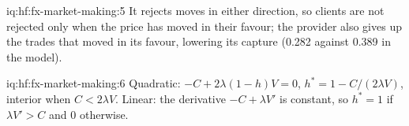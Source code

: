 \begin{solution}{iq:hf:fx-market-making:5}
It rejects moves in either direction, so clients are not rejected only when the price has moved in their favour; the provider also gives up the
trades that moved in its favour, lowering its capture (0.282 against 0.389 in the model).
\end{solution}

\begin{solution}{iq:hf:fx-market-making:6}
Quadratic: $-C+2\lambda(1-h)V=0$, $h^\ast=1-C/(2\lambda V)$, interior when $C<2\lambda V$. Linear: the derivative $-C+\lambda V'$ is constant, so
$h^\ast=1$ if $\lambda V'>C$ and $0$ otherwise.
\end{solution}
